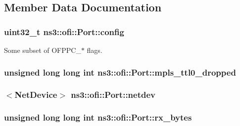 \subsection{Member Data Documentation}
\subsubsection[{\texorpdfstring{config}{config}}]{\setlength{\rightskip}{0pt plus 5cm}uint32\+\_\+t ns3\+::ofi\+::\+Port\+::config}\hypertarget{structns3_1_1ofi_1_1Port_ad8f4ac5b3250cb95b9def06d4938498e}{}\label{structns3_1_1ofi_1_1Port_ad8f4ac5b3250cb95b9def06d4938498e}


Some subset of O\+F\+P\+P\+C\+\_\+$\ast$ flags. 

\subsubsection[{\texorpdfstring{mpls\+\_\+ttl0\+\_\+dropped}{mpls_ttl0_dropped}}]{\setlength{\rightskip}{0pt plus 5cm}unsigned {\bf long} {\bf long} int ns3\+::ofi\+::\+Port\+::mpls\+\_\+ttl0\+\_\+dropped}\hypertarget{structns3_1_1ofi_1_1Port_a5a4c41eeb97b3a018560760f47792e29}{}\label{structns3_1_1ofi_1_1Port_a5a4c41eeb97b3a018560760f47792e29}
\subsubsection[{\texorpdfstring{netdev}{netdev}}]{$<${\bf Net\+Device}$>$ ns3\+::ofi\+::\+Port\+::netdev}\hypertarget{structns3_1_1ofi_1_1Port_a28289df8d54bcdb5e84e19b17d1f60a1}{}\label{structns3_1_1ofi_1_1Port_a28289df8d54bcdb5e84e19b17d1f60a1}
\subsubsection[{\texorpdfstring{rx\+\_\+bytes}{rx_bytes}}]{\setlength{\rightskip}{0pt plus 5cm}unsigned {\bf long} {\bf long} int ns3\+::ofi\+::\+Port\+::rx\+\_\+bytes}\hypertarget{structns3_1_1ofi_1_1Port_ab544aa4221c5c5721c1e22aa7cc34d53}{}\label{structns3_1_1ofi_1_1Port_ab544aa4221c5c5721c1e22aa7cc34d53}
